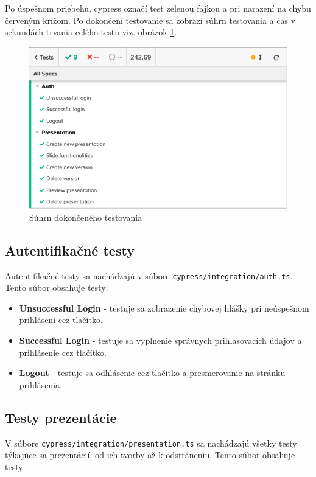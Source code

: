 Po úspešnom priebehu, cypress označí test zelenou fajkou a pri narazení na chybu červeným krížom. Po dokončení testovanie sa zobrazí súhrn testovania a čas v sekundách trvania celého testu viz. obrázok \ref{pic:cypress}.

    \begin{figure}[!hbt]
        \centering
        \includegraphics[scale=0.4]{obrazky/cypress.png}
        \caption{Súhrn dokončeného testovania}
        \label{pic:cypress}
    \end{figure}

\subsection*{Autentifikačné testy}
Autentifikačné testy sa nachádzajú v súbore \texttt{cypress/integration/auth.ts}. Tento súbor obsahuje testy:

    \begin{itemize}
        \item\textbf{Unsuccessful Login} - testuje sa zobrazenie chybovej hlášky pri neúspešnom prihlásení cez tlačítko.    
        \item\textbf{Successful Login} - testuje sa vyplnenie správnych prihlasovacích údajov a prihlásenie cez tlačítko.
        \item\textbf{Logout} - testuje sa odhlásenie cez tlačítko a presmerovanie na stránku prihlásenia.
    \end{itemize}
    
\subsection*{Testy prezentácie}
V súbore \texttt{cypress/integration/presentation.ts} sa nachádzajú všetky testy týkajúce sa prezentácií, od ich tvorby až k odstráneniu. Tento súbor obsahuje testy:

